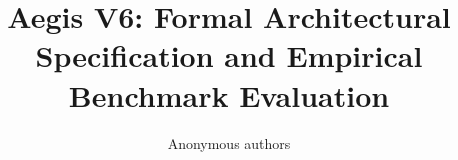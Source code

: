 \title{\textbf{Aegis V6: Formal Architectural Specification and Empirical Benchmark Evaluation}}

\author{Anonymous authors}
